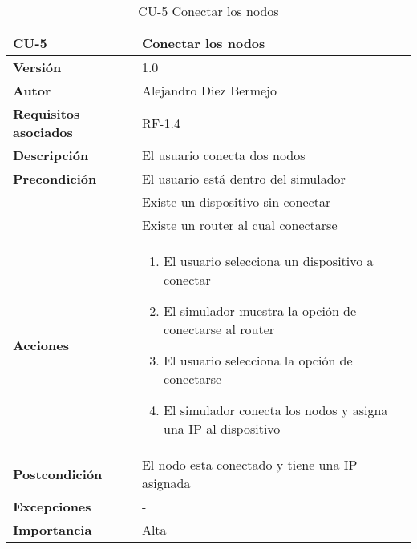 \begin{table}[p]
	\centering
	\begin{tabularx}{\linewidth}{ p{} p{} }
		\toprule
		\textbf{CU-5}    & \textbf{Conectar los nodos}\\
		\toprule
		\textbf{Versión}              & 1.0    \\
		\textbf{Autor}                & Alejandro Diez Bermejo \\
		\textbf{Requisitos asociados} & RF-1.4 \\
		\textbf{Descripción}          & El usuario conecta dos nodos \\
		\textbf{Precondición}         & El usuario está dentro del simulador \\
                                      & Existe un dispositivo sin conectar \\
                                      & Existe un router al cual conectarse \\
		\textbf{Acciones}             &
		\begin{enumerate}
			\def\labelenumi{\arabic{enumi}.}
			\tightlist
			\item El usuario selecciona un dispositivo a conectar
            \item El simulador muestra la opción de conectarse al router
            \item El usuario selecciona la opción de conectarse
            \item El simulador conecta los nodos y asigna una IP al dispositivo
		\end{enumerate}\\
		\textbf{Postcondición}        & El nodo esta conectado y tiene una IP asignada \\
		\textbf{Excepciones}          & - \\
		\textbf{Importancia}          & Alta \\
		\bottomrule
	\end{tabularx}
	\caption{CU-5 Conectar los nodos}
\end{table}

